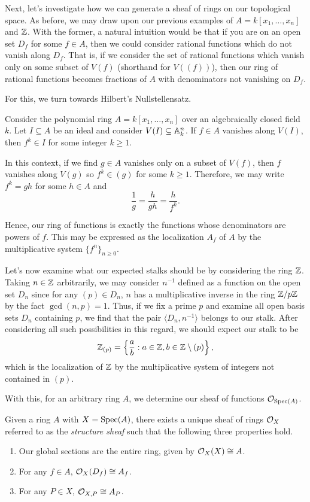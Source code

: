 \documentclass[12pt]{article}
\begin{document}
Next, let's investigate how we can generate a sheaf of rings on our topological space. 
As before, we may draw upon our previous examples of $A = k[x_1, \ldots, x_n]$ and $\mathbb{Z}$.
With the former, a natural intuition would be that if you are on an open set $D_f$ for some $f \in A$,
then we could consider rational functions which do not vanish along $D_f$.
That is, if we consider the set of rational functions which vanish only on some subset of $V(f)$ (shorthand for $V((f))$),
then our ring of rational functions becomes fractions of $A$ with denominators not vanishing on $D_f$.

For this, we turn towards Hilbert's Nullstellensatz. 

\begin{theorem}
    Consider the polynomial ring $A = k[x_1, \ldots, x_n]$ over an algebraically closed field $k$.
    Let $I \subseteq A$ be an ideal and consider $V(I) \subseteq \mathbb{A}_k^n$.
    If $f \in A$ vanishes along $V(I)$, then $f^k \in I$ for some integer $k \geq 1$. 
\end{theorem}

In this context, if we find $g \in A$ vanishes only on a subset of $V(f)$,
then $f$ vanishes along $V(g)$ so $f^k \in (g)$ for some $k \geq 1$. 
Therefore, we may write $f^k = gh$ for some $h \in A$ and
\[
    \frac{1}{g} = \frac{h}{gh} = \frac{h}{f^k}.
\]

Hence, our ring of functions is exactly the functions whose denominators are powers of $f$.
This may be expressed as the localization $A_f$ of $A$ by the multiplicative system $\{ f^n \}_{n \geq 0}$.

Let's now examine what our expected stalks should be by considering the ring $\mathbb{Z}$.
Taking $n \in \mathbb{Z}$ arbitrarily, we may consider $n^{-1}$ defined as a function on the open set $D_n$ since for any $(p) \in D_n$,
$n$ has a multiplicative inverse in the ring $\mathbb{Z}/p\mathbb{Z}$ by the fact $\gcd(n, p) = 1$.
Thus, if we fix a prime $p$ and examine all open basis sets $D_n$ containing $p$,
we find that the pair $\langle D_n, n^{-1} \rangle$ belongs to our stalk.
After considering all such possibilities in this regard, we should expect our stalk to be
\[
    \mathbb{Z}_{(p)} = \left\{
        \frac{a}{b} : a \in \mathbb{Z}, b \in \mathbb{Z} \setminus (p)
    \right\},
\]
which is the localization of $\mathbb{Z}$ by the multiplicative system of integers not contained in $(p)$.


With this, for an arbitrary ring $A$, we determine our sheaf of functions $\mathcal{O}_{{\rm Spec}(A)}$.

\begin{theorem}
    Given a ring $A$ with $X = {\rm Spec}(A)$,
    there exists a unique sheaf of rings $\mathcal{O}_X$ referred to as the \textit{structure sheaf} such that the following three properties hold.
    \begin{enumerate}
        \item Our global sections are the entire ring, given by $\mathcal{O}_X(X) \cong A$.
        \item For any $f \in A$, $\mathcal{O}_X(D_f) \cong A_f$.
        \item For any $P \in X$, $\mathcal{O}_{X, P} \cong A_P$.
    \end{enumerate}
\end{theorem}
\end{document}
